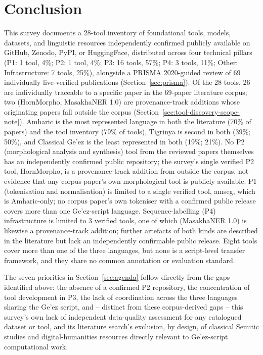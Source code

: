 \documentclass[sn-mathphys-num]{sn-jnl}
\theoremstyle{thmstyleone}
\theoremstyle{thmstyletwo}
\theoremstyle{thmstylethree}
\begin{document}
\section{Conclusion}\label{sec:conclusion}

This survey documents a 28-tool inventory of foundational tools, models, datasets, and linguistic resources independently confirmed publicly available on GitHub, Zenodo, PyPI, or HuggingFace, distributed across four technical pillars (P1: 1 tool, 4\%; P2: 1 tool, 4\%; P3: 16 tools, 57\%; P4: 3 tools, 11\%; Other: Infrastructure: 7 tools, 25\%), alongside a PRISMA 2020-guided review of 69 individually live-verified publications (Section~\ref{sec:prisma}). Of the 28 tools, 26 are individually traceable to a specific paper in the 69-paper literature corpus; two (HornMorpho, MasakhaNER 1.0) are provenance-track additions whose originating papers fall outside the corpus (Section~\ref{sec:tool-discovery-scope-note}). Amharic is the most represented language in both the literature (70\% of papers) and the tool inventory (79\% of tools), Tigrinya is second in both (39\%; 50\%), and Classical Ge'ez is the least represented in both (19\%; 21\%). No P2 (morphological analysis and synthesis) tool from the reviewed papers themselves has an independently confirmed public repository; the survey's single verified P2 tool, HornMorpho, is a provenance-track addition from outside the corpus, not evidence that any corpus paper's own morphological tool is publicly available. P1 (tokenisation and normalisation) is limited to a single verified tool, amseg, which is Amharic-only; no corpus paper's own tokeniser with a confirmed public release covers more than one Ge'ez-script language. Sequence-labelling (P4) infrastructure is limited to 3 verified tools, one of which (MasakhaNER 1.0) is likewise a provenance-track addition; further artefacts of both kinds are described in the literature but lack an independently confirmable public release. Eight tools cover more than one of the three languages, but none is a script-level transfer framework, and they share no common annotation or evaluation standard.

The seven priorities in Section~\ref{sec:agenda} follow directly from the gaps identified above: the absence of a confirmed P2 repository, the concentration of tool development in P3, the lack of coordination across the three languages sharing the Ge'ez script, and -- distinct from these corpus-derived gaps -- this survey's own lack of independent data-quality assessment for any catalogued dataset or tool, and its literature search's exclusion, by design, of classical Semitic studies and digital-humanities resources directly relevant to Ge'ez-script computational work.
\end{document}

